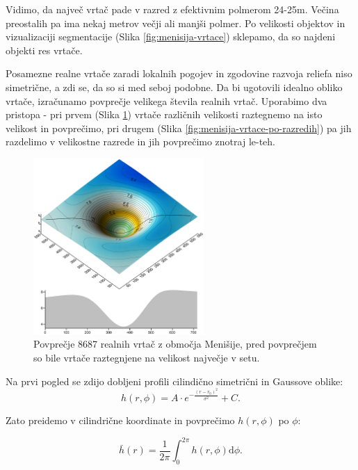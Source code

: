 \documentclass[a4paper, twoside, 12pt]{book}
\begin{document}
Vidimo, da največ vrtač pade v razred z efektivnim polmerom 24-25m. Večina preostalih pa ima nekaj metrov večji ali manjši polmer. Po velikosti objektov in vizualizaciji segmentacije (Slika \ref{fig:menisija-vrtace}) sklepamo, da so najdeni objekti res vrtače.

  Posamezne realne vrtače zaradi lokalnih pogojev in zgodovine razvoja reliefa niso simetrične, a zdi se, da so si med seboj podobne. Da bi ugotovili idealno obliko vrtače, izračunamo povprečje velikega števila realnih vrtač. Uporabimo dva pristopa - pri prvem (Slika \ref{fig:menisija-vrtaca}) vrtače različnih velikosti raztegnemo na isto velikost in povprečimo, pri drugem (Slika \ref{fig:menisija-vrtace-po-razredih}) pa jih razdelimo v velikostne razrede in jih povprečimo znotraj le-teh.

  \begin{figure}[h]
    \begin{center}
      \includegraphics[width=6.5cm]{slike/menisija-vrtaca}
    \end{center}
    \caption{Povprečje 8687 realnih vrtač z območja Menišije, pred povprečjem so bile vrtače raztegnjene na velikost največje v setu.}
    \label{fig:menisija-vrtaca}
  \end{figure}

  Na prvi pogled se zdijo dobljeni profili cilindično simetrični in Gaussove oblike:
  \begin{equation}
    h(r,\phi) = A \cdot e^{-\frac{(r-r_0)^2}{\sigma^2}} + C.
    \label{fit-vrtace}
  \end{equation}

Zato preidemo v cilindrične koordinate in povprečimo $h(r,\phi)$ po $\phi$:

\begin{equation} 
  \bar h(r) = \frac{1}{2 \pi} \int_0^{2\pi} h(r,\phi) \mathrm{d}\phi.
  \label{povprecenje-phi}
\end{equation}
\end{document}
